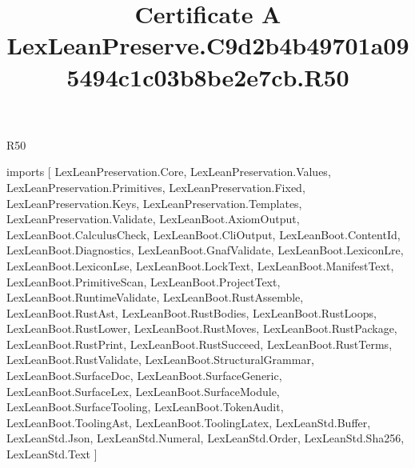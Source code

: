 \begin{lexlean}{R50}
\title{Certificate A LexLeanPreserve.C9d2b4b49701a095494c1c03b8be2e7cb.R50}
\begin{coremodule}
imports [
  LexLeanPreservation.Core,
  LexLeanPreservation.Values,
  LexLeanPreservation.Primitives,
  LexLeanPreservation.Fixed,
  LexLeanPreservation.Keys,
  LexLeanPreservation.Templates,
  LexLeanPreservation.Validate,
  LexLeanBoot.AxiomOutput,
  LexLeanBoot.CalculusCheck,
  LexLeanBoot.CliOutput,
  LexLeanBoot.ContentId,
  LexLeanBoot.Diagnostics,
  LexLeanBoot.GnafValidate,
  LexLeanBoot.LexiconLre,
  LexLeanBoot.LexiconLse,
  LexLeanBoot.LockText,
  LexLeanBoot.ManifestText,
  LexLeanBoot.PrimitiveScan,
  LexLeanBoot.ProjectText,
  LexLeanBoot.RuntimeValidate,
  LexLeanBoot.RustAssemble,
  LexLeanBoot.RustAst,
  LexLeanBoot.RustBodies,
  LexLeanBoot.RustLoops,
  LexLeanBoot.RustLower,
  LexLeanBoot.RustMoves,
  LexLeanBoot.RustPackage,
  LexLeanBoot.RustPrint,
  LexLeanBoot.RustSucceed,
  LexLeanBoot.RustTerms,
  LexLeanBoot.RustValidate,
  LexLeanBoot.StructuralGrammar,
  LexLeanBoot.SurfaceDoc,
  LexLeanBoot.SurfaceGeneric,
  LexLeanBoot.SurfaceLex,
  LexLeanBoot.SurfaceModule,
  LexLeanBoot.SurfaceTooling,
  LexLeanBoot.TokenAudit,
  LexLeanBoot.ToolingAst,
  LexLeanBoot.ToolingLatex,
  LexLeanStd.Buffer,
  LexLeanStd.Json,
  LexLeanStd.Numeral,
  LexLeanStd.Order,
  LexLeanStd.Sha256,
  LexLeanStd.Text
]


\end{coremodule}
\end{lexlean}
